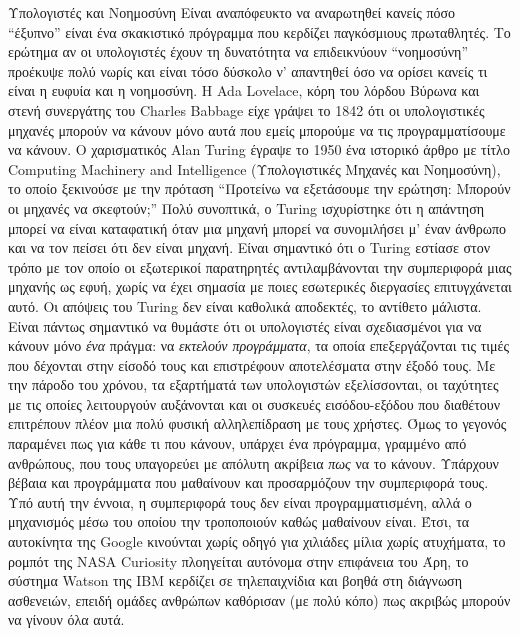 \documentclass[a4paper,11pt,oneside]{book}
\begin{document}
\begin{theory}{Υπολογιστές και Νοημοσύνη}
Είναι αναπόφευκτο να αναρωτηθεί κανείς πόσο ``έξυπνο'' είναι ένα σκακιστικό πρόγραμμα που κερδίζει παγκόσμιους πρωταθλητές. Το ερώτημα αν οι υπολογιστές έχουν τη δυνατότητα να επιδεικνύουν ``νοημοσύνη'' προέκυψε πολύ νωρίς και είναι τόσο δύσκολο ν' απαντηθεί όσο να ορίσει κανείς τι είναι η ευφυία και η νοημοσύνη. Η Ada Lovelace, κόρη του λόρδου Βύρωνα και στενή συνεργάτης του Charles Babbage είχε γράψει το 1842 ότι οι υπολογιστικές μηχανές μπορούν να κάνουν μόνο αυτά που εμείς μπορούμε να τις προγραμματίσουμε να κάνουν. Ο χαρισματικός Alan Turing έγραψε το 1950 ένα ιστορικό άρθρο με τίτλο Computing Machinery and Intelligence (Υπολογιστικές Μηχανές και Νοημοσύνη), το οποίο ξεκινούσε με την πρόταση ``Προτείνω να εξετάσουμε την ερώτηση: Μπορούν οι μηχανές να σκεφτούν;'' Πολύ συνοπτικά, ο Turing ισχυρίστηκε ότι η απάντηση μπορεί να είναι καταφατική όταν μια μηχανή μπορεί να συνομιλήσει μ' έναν άνθρωπο και να τον πείσει ότι δεν είναι μηχανή. Είναι σημαντικό ότι ο Turing εστίασε στον τρόπο με τον οποίο οι εξωτερικοί παρατηρητές αντιλαμβάνονται την συμπεριφορά μιας μηχανής ως εφυή, χωρίς να έχει σημασία με ποιες εσωτερικές διεργασίες επιτυγχάνεται αυτό. Οι απόψεις του Turing δεν είναι καθολικά αποδεκτές, το αντίθετο μάλιστα. Είναι πάντως σημαντικό να θυμάστε ότι οι υπολογιστές είναι σχεδιασμένοι για να κάνουν μόνο \emph{ένα} πράγμα: να \emph{εκτελούν προγράμματα}, τα οποία επεξεργάζονται τις τιμές που δέχονται στην είσοδό τους και επιστρέφουν αποτελέσματα στην έξοδό τους. Με την πάροδο του χρόνου, τα εξαρτήματά των υπολογιστών εξελίσσονται, οι ταχύτητες με τις οποίες λειτουργούν αυξάνονται και οι συσκευές εισόδου-εξόδου που διαθέτουν επιτρέπουν πλέον μια πολύ φυσική αλληλεπίδραση με τους χρήστες. Όμως το γεγονός παραμένει πως για κάθε τι που κάνουν, υπάρχει ένα πρόγραμμα, γραμμένο από ανθρώπους, που τους υπαγορεύει με απόλυτη ακρίβεια \emph{πως} να το κάνουν. Υπάρχουν βέβαια και προγράμματα που μαθαίνουν και προσαρμόζουν την συμπεριφορά τους. Υπό αυτή την έννοια, η συμπεριφορά τους δεν είναι προγραμματισμένη, αλλά ο μηχανισμός μέσω του οποίου την τροποποιούν καθώς μαθαίνουν είναι. Έτσι, τα αυτοκίνητα της Google κινούνται χωρίς οδηγό για χιλιάδες μίλια χωρίς ατυχήματα, το ρομπότ της NASA Curiosity πλοηγείται αυτόνομα στην επιφάνεια του Άρη, το σύστημα Watson της IBM κερδίζει σε τηλεπαιχνίδια και βοηθά στη διάγνωση ασθενειών, επειδή ομάδες ανθρώπων καθόρισαν (με πολύ κόπο) πως ακριβώς μπορούν να γίνουν όλα αυτά. 


\end{theory}
\end{document}
